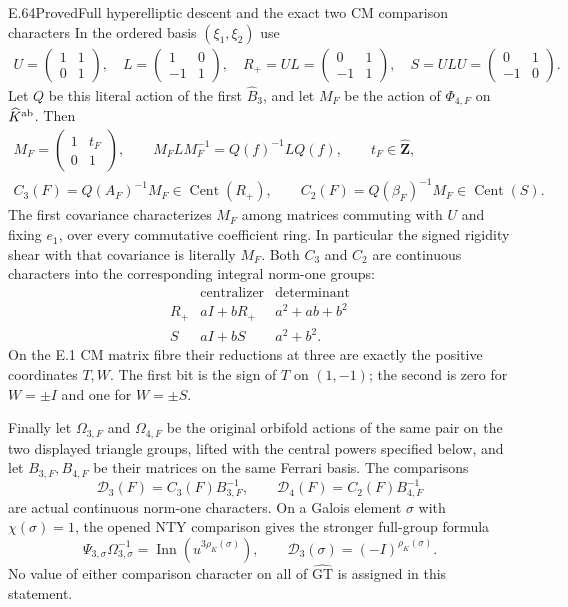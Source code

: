 \begin{statement}{E.64}{Proved}{Full hyperelliptic descent and the exact two CM comparison characters}
In the ordered basis $(\xi_1,\xi_2)$ use
\[
 \begin{gathered}
 U=\begin{pmatrix}1&1\\0&1\end{pmatrix},\quad
 L=\begin{pmatrix}1&0\\-1&1\end{pmatrix},\quad
 R_+=UL=\begin{pmatrix}0&1\\-1&1\end{pmatrix},\quad
 S=ULU=\begin{pmatrix}0&1\\-1&0\end{pmatrix}.
 \end{gathered}
 \tag{E.64.9}
\]
Let $Q$ be this literal action of the first $\widehat B_3$, and
let $M_F$ be the action of $\Phi_{4,F}$ on $\widehat K^{\rm ab}$.
Then
\[
 \begin{gathered}
 M_F=\begin{pmatrix}1&t_F\\0&1\end{pmatrix},\qquad
 M_FL M_F^{-1}=Q(f)^{-1}LQ(f),\qquad t_F\in\widehat{\mathbf Z},\\
 C_3(F)=Q(A_F)^{-1}M_F\in\operatorname{Cent}(R_+),\qquad
 C_2(F)=Q(\beta_F)^{-1}M_F\in\operatorname{Cent}(S).
 \end{gathered}
 \tag{E.64.10}
\]
The first covariance characterizes $M_F$ among matrices commuting
with $U$ and fixing $e_1$, over every commutative coefficient ring.
In particular the signed rigidity shear with that covariance is
literally $M_F$.  Both $C_3$ and $C_2$ are continuous characters
into the corresponding integral norm-one groups:
\[
 \begin{array}{c|c|c}
  &\text{centralizer}&\text{determinant}\\ \hline
 R_+&aI+bR_+&a^2+ab+b^2\\
 S&aI+bS&a^2+b^2.
 \end{array}
 \tag{E.64.11}
\]
On the E.1 CM matrix fibre their reductions at three are exactly
the positive coordinates $T,W$.  The first bit is the sign of
$T$ on $(1,-1)$; the second is zero for $W=\pm I$ and one for
$W=\pm S$.

Finally let $\Omega_{3,F}$ and $\Omega_{4,F}$ be the original
orbifold actions of the same pair on the two displayed triangle
groups, lifted with the central powers specified below, and let
$B_{3,F},B_{4,F}$ be their matrices on the same Ferrari basis.
The comparisons
\[
 \mathcal D_3(F)=C_3(F)B_{3,F}^{-1},\qquad
 \mathcal D_4(F)=C_2(F)B_{4,F}^{-1}
 \tag{E.64.12}
\]
are actual continuous norm-one characters.  On a Galois element
$\sigma$ with $\chi(\sigma)=1$, the opened NTY comparison gives
the stronger full-group formula
\[
 \Psi_{3,\sigma}\Omega_{3,\sigma}^{-1}
       =\operatorname{Inn}(u^{3\rho_K(\sigma)}),\qquad
 \mathcal D_3(\sigma)=(-I)^{\rho_K(\sigma)}.
 \tag{E.64.13}
\]
No value of either comparison character on all of
$\widehat{\mathrm{GT}}$ is assigned in this statement.
\end{statement}
